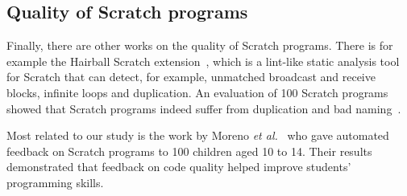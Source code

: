 \documentclass{sig-alternate}
\newcommand{\todo}[1]{\textbf{#1}}
\begin{document}

\subsection{Quality of Scratch programs}
Finally, there are other works on the quality of Scratch programs. There is for example the Hairball Scratch extension~\cite{boe_hairball:_2013}, which is a lint-like static analysis tool for Scratch that can detect, for example, unmatched broadcast and receive blocks, infinite loops and duplication. An evaluation of 100 Scratch programs showed that Scratch programs indeed suffer from duplication and bad naming~\cite{moreno_automatic_2014}.

Most related to our study is the work by Moreno \emph{et al.}~\cite{moreno-leon_dr._2015} who gave automated feedback on Scratch programs to 100 children aged 10 to 14. Their results demonstrated that feedback on code quality helped improve students' programming skills.




\end{document}
